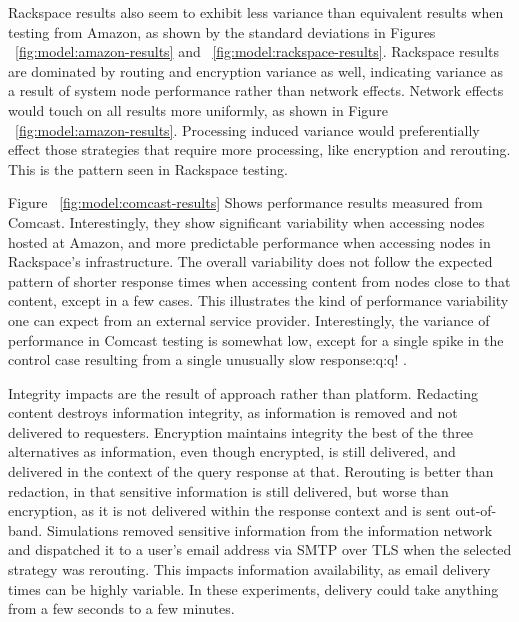 Rackspace results also seem to exhibit less variance than equivalent results when testing from Amazon, as shown by the standard deviations in Figures ~\ref{fig:model:amazon-results} and ~\ref{fig:model:rackspace-results}.  Rackspace results are dominated by routing and encryption variance as well, indicating variance as a result of system node performance rather than network effects.  Network effects would touch on all results more uniformly, as shown in Figure ~\ref{fig:model:amazon-results}.  Processing induced variance would preferentially effect those strategies that require more processing, like encryption and rerouting.  This is the pattern seen in Rackspace testing.

Figure ~\ref{fig:model:comcast-results} Shows performance results measured from Comcast.  Interestingly, they show significant variability when accessing nodes hosted at Amazon, and more predictable performance when accessing nodes in Rackspace's infrastructure.  The overall variability does not follow the expected pattern of shorter response times when accessing content from nodes close to that content, except in a few cases.  This illustrates the kind of performance variability one can expect from an external service provider.  Interestingly, the variance of performance in Comcast testing is somewhat low, except for a single spike in the control case resulting from a single unusually slow response:q:q!
.

Integrity impacts are the result of approach rather than platform.  Redacting content destroys information integrity, as information is removed and not delivered to requesters.  Encryption maintains integrity the best of the three alternatives as information, even though encrypted, is still delivered, and delivered in the context of the query response at that.  Rerouting is better than redaction, in that sensitive information is still delivered, but worse than encryption, as it is not delivered within the response context and is sent out-of-band. Simulations removed sensitive information from the information network and dispatched it to a user's email address via SMTP over TLS when the selected strategy was rerouting.  This impacts information availability, as email delivery times can be highly variable.  In these experiments, delivery could take anything from a few seconds to a few minutes.


